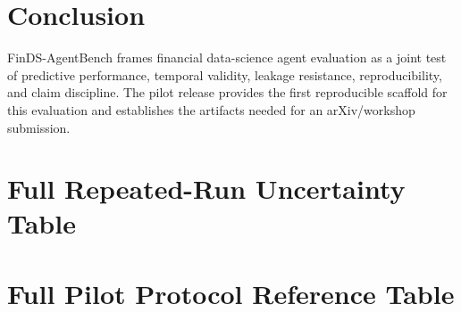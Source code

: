\documentclass[11pt]{article}
\begin{document}
\section{Conclusion}
FinDS-AgentBench frames financial data-science agent evaluation as a joint test of predictive performance, temporal validity, leakage resistance, reproducibility, and claim discipline. The pilot release provides the first reproducible scaffold for this evaluation and establishes the artifacts needed for an arXiv/workshop submission.

\appendix
\section{Full Repeated-Run Uncertainty Table}


\section{Full Pilot Protocol Reference Table}




\end{document}
